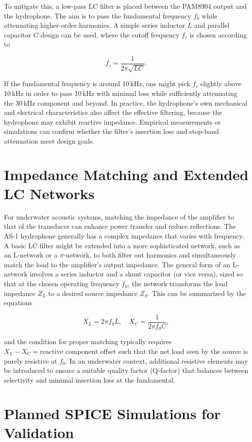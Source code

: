 To mitigate this, a low-pass LC filter is placed between the PAM8904 output and the hydrophone. The aim is to pass the fundamental frequency \(f_0\) while attenuating higher-order harmonics. A simple series inductor \(L\) and parallel capacitor \(C\) design can be used, where the cutoff frequency \(f_c\) is chosen according to

\[
f_c = \frac{1}{2\pi \sqrt{LC}}.
\]

If the fundamental frequency is around 10\,kHz, one might pick \(f_c\) slightly above 10\,kHz in order to pass 10\,kHz with minimal loss while sufficiently attenuating the 30\,kHz component and beyond. In practice, the hydrophone's own mechanical and electrical characteristics also affect the effective filtering, because the hydrophone may exhibit reactive impedance. Empirical measurements or simulations can confirm whether the filter's insertion loss and stop-band attenuation meet design goals.

\section{Impedance Matching and Extended LC Networks}

For underwater acoustic systems, matching the impedance of the amplifier to that of the transducer can enhance power transfer and reduce reflections. The AS-1 hydrophone generally has a complex impedance that varies with frequency. A basic LC filter might be extended into a more sophisticated network, such as an L-network or a \(\pi\)-network, to both filter out harmonics and simultaneously match the load to the amplifier's output impedance. The general form of an L-network involves a series inductor and a shunt capacitor (or vice versa), sized so that at the chosen operating frequency \(f_0\), the network transforms the load impedance \(Z_L\) to a desired source impedance \(Z_S\). This can be summarized by the equations

\[
X_L = 2\pi f_0 L, \quad
X_C = \frac{1}{2\pi f_0 C},
\]

and the condition for proper matching typically requires \(X_L - X_C = \text{reactive component offset}\) such that the net load seen by the source is purely resistive at \(f_0\). In an underwater context, additional resistive elements may be introduced to ensure a suitable quality factor (Q-factor) that balances between selectivity and minimal insertion loss at the fundamental. 

\section{Planned SPICE Simulations for Validation}

